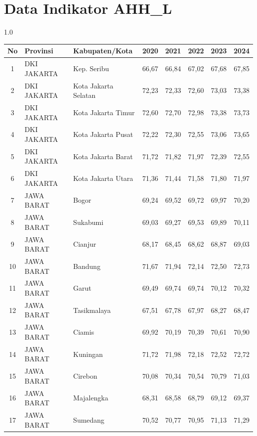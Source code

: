 \section*{Data Indikator AHH\_L}
\begin{spacing}{1.0}
\scriptsize
\setlength{\tabcolsep}{2pt}
\begin{longtable}{|c|p{2.2cm}|p{2.8cm}|c|c|c|c|c|}
\hline
\textbf{No} & \textbf{Provinsi} & \textbf{Kabupaten/Kota} & \textbf{2020} & \textbf{2021} & \textbf{2022} & \textbf{2023} & \textbf{2024} \\ \hline
\endhead
1 & DKI JAKARTA & Kep. Seribu & 66,67 & 66,84 & 67,02 & 67,68 & 67,85 \\ \hline
2 & DKI JAKARTA & Kota Jakarta Selatan & 72,23 & 72,33 & 72,60 & 73,03 & 73,38 \\ \hline
3 & DKI JAKARTA & Kota Jakarta Timur & 72,60 & 72,70 & 72,98 & 73,38 & 73,73 \\ \hline
4 & DKI JAKARTA & Kota Jakarta Pusat & 72,22 & 72,30 & 72,55 & 73,06 & 73,65 \\ \hline
5 & DKI JAKARTA & Kota Jakarta Barat & 71,72 & 71,82 & 71,97 & 72,39 & 72,55 \\ \hline
6 & DKI JAKARTA & Kota Jakarta Utara & 71,36 & 71,44 & 71,58 & 71,80 & 71,97 \\ \hline
7 & JAWA BARAT & Bogor & 69,24 & 69,52 & 69,72 & 69,97 & 70,20 \\ \hline
8 & JAWA BARAT & Sukabumi & 69,03 & 69,27 & 69,53 & 69,89 & 70,11 \\ \hline
9 & JAWA BARAT & Cianjur & 68,17 & 68,45 & 68,62 & 68,87 & 69,03 \\ \hline
10 & JAWA BARAT & Bandung & 71,67 & 71,94 & 72,14 & 72,50 & 72,73 \\ \hline
11 & JAWA BARAT & Garut & 69,49 & 69,74 & 69,74 & 70,12 & 70,32 \\ \hline
12 & JAWA BARAT & Tasikmalaya & 67,51 & 67,78 & 67,97 & 68,27 & 68,47 \\ \hline
13 & JAWA BARAT & Ciamis & 69,92 & 70,19 & 70,39 & 70,61 & 70,90 \\ \hline
14 & JAWA BARAT & Kuningan & 71,72 & 71,98 & 72,18 & 72,52 & 72,72 \\ \hline
15 & JAWA BARAT & Cirebon & 70,08 & 70,34 & 70,54 & 70,79 & 71,03 \\ \hline
16 & JAWA BARAT & Majalengka & 68,31 & 68,58 & 68,79 & 69,12 & 69,37 \\ \hline
17 & JAWA BARAT & Sumedang & 70,52 & 70,77 & 70,95 & 71,13 & 71,29 \\ \hline

\end{longtable}
\end{spacing}
